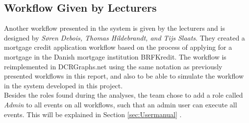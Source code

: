 \subsection{Workflow Given by Lecturers \label{sec:WorkflowGivenByLecturer}}
Another workflow presented in the system is given by the lecturers and is designed by \textit{Søren Debois, Thomas Hildebrandt, and Tijs Slaats}. They created a mortgage credit application workflow based on the process of applying for a mortgage in the Danish mortgage institution BRFKredit. The workflow is reimplemented in DCRGraphs.net using the same notation as previously presented workflows in this report, and also to be able to simulate the workflow in the system developed in this project. \\

Besides the roles found during the analyses, the team chose to add a role called \textit{Admin} to all events on all workflows, such that an admin user can execute all events. This will be explained in Section \ref{sec:Usermanual} . 